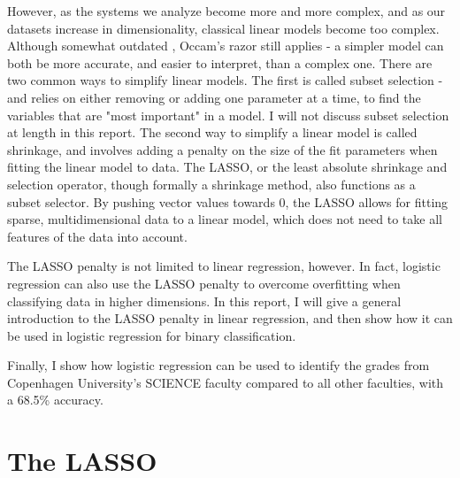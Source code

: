 \documentclass[%
 reprint,
 amsmath,amssymb,
 aps,
]{revtex4-1}
\begin{document}
However, as the systems we analyze become more and more complex, and as our datasets increase in dimensionality, classical linear models become too complex. \cite{efron_least_2004}
Although somewhat outdated \cite{courtney_comments_2008}, Occam's razor still applies - a simpler model can both be more accurate, and easier to interpret, than a complex one.
There are two common ways to simplify linear models.
The first is called subset selection - and relies on either removing or adding one parameter at a time, to find the variables that are "most important" in a model.
I will not discuss subset selection at length in this report.
The second way to simplify a linear model is called shrinkage, and involves adding a penalty on the size of the fit parameters when fitting the linear model to data.
The LASSO, or the least absolute shrinkage and selection operator, though formally a shrinkage method, also functions as a subset selector.
By pushing vector values towards 0, the LASSO allows for fitting sparse, multidimensional data to a linear model, which does not need to take all features of the data into account.

The LASSO penalty is not limited to linear regression, however.
In fact, logistic regression can also use the LASSO penalty to overcome overfitting when classifying data in higher dimensions.
In this report, I will give a general introduction to the LASSO penalty in linear regression, and then show how it can be used in logistic regression for binary classification.

Finally, I show how logistic regression can be used to identify the grades from Copenhagen University's SCIENCE faculty compared to all other faculties, with a 68.5\% accuracy.


\section{The LASSO}
\end{document}
